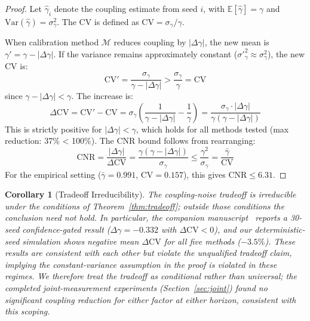 \documentclass[11pt]{article}
\newcommand{\CV}{\ensuremath{\mathrm{CV}}}
\newtheorem{corollary}[theorem]{Corollary}
\theoremstyle{definition}
\theoremstyle{remark}
\begin{document}
\begin{proof}
Let $\hat{\gamma}_i$ denote the coupling estimate from seed $i$, with $\mathbb{E}[\hat{\gamma}] = \gamma$ and $\text{Var}(\hat{\gamma}) = \sigma^2_{\gamma}$. The CV is defined as $\CV = \sigma_{\gamma} / \gamma$.

When calibration method $\mathcal{M}$ reduces coupling by $|\Delta\gamma|$, the new mean is $\gamma' = \gamma - |\Delta\gamma|$. If the variance remains approximately constant ($\sigma'^2_{\gamma} \approx \sigma^2_{\gamma}$), the new CV is:
\begin{equation}
    \CV' = \frac{\sigma_{\gamma}}{\gamma - |\Delta\gamma|} > \frac{\sigma_{\gamma}}{\gamma} = \CV
\end{equation}
since $\gamma - |\Delta\gamma| < \gamma$. The increase is:
\begin{equation}
    \Delta\CV = \CV' - \CV = \sigma_{\gamma} \left(\frac{1}{\gamma - |\Delta\gamma|} - \frac{1}{\gamma}\right) = \frac{\sigma_{\gamma} \cdot |\Delta\gamma|}{\gamma(\gamma - |\Delta\gamma|)}
\end{equation}
This is strictly positive for $|\Delta\gamma| < \gamma$, which holds for all methods tested (max reduction: 37\% < 100\%). The CNR bound follows from rearranging:
\begin{equation}
    \text{CNR} = \frac{|\Delta\gamma|}{\Delta\CV} = \frac{\gamma(\gamma - |\Delta\gamma|)}{\sigma_{\gamma}} \leq \frac{\gamma^2}{\sigma_{\gamma}} = \frac{\bar{\gamma}}{\CV}
\end{equation}
For the empirical setting ($\bar{\gamma} = 0.991$, $\CV = 0.157$), this gives $\text{CNR} \leq 6.31$.
\end{proof}

\begin{corollary}[Tradeoff Irreducibility]
The coupling-noise tradeoff is irreducible under the conditions of Theorem~\ref{thm:tradeoff}; outside those conditions the conclusion need not hold. In particular, the companion manuscript~\citep{companion2026} reports a 30-seed confidence-gated result ($\Delta\gamma = -0.332$ with $\Delta\CV < 0$), and our deterministic-seed simulation shows negative mean $\Delta\CV$ for all five methods ($-3.5\%$). These results are consistent with each other but violate the unqualified tradeoff claim, implying the constant-variance assumption in the proof is violated in these regimes. We therefore treat the tradeoff as conditional rather than universal; the completed joint-measurement experiments (Section~\ref{sec:joint}) found no significant coupling reduction for either factor at either horizon, consistent with this scoping.
\end{corollary}
\end{document}
